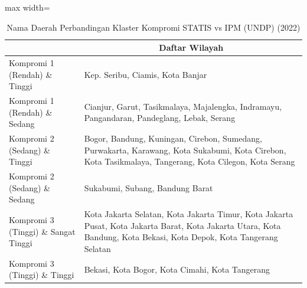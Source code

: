 \begin{table}[H]
\centering
\caption{Nama Daerah Perbandingan Klaster Kompromi STATIS vs IPM (UNDP) (2022)} \label{tab:app1comp_ipm_name_2022}
\begin{adjustbox}{max width=\textwidth}
\begin{tabular}{|>{\centering\arraybackslash}p{4cm}|p{10cm}|}
\hline
\multicolumn{1}{|c|}{\textbf{Kategori}} & \multicolumn{1}{c|}{\textbf{Daftar Wilayah}} \\
\hline
Kompromi 1 (Rendah) \& Tinggi & Kep. Seribu, Ciamis, Kota Banjar \\
\hline
Kompromi 1 (Rendah) \& Sedang & Cianjur, Garut, Tasikmalaya, Majalengka, Indramayu, Pangandaran, Pandeglang, Lebak, Serang \\
\hline
Kompromi 2 (Sedang) \& Tinggi & Bogor, Bandung, Kuningan, Cirebon, Sumedang, Purwakarta, Karawang, Kota Sukabumi, Kota Cirebon, Kota Tasikmalaya, Tangerang, Kota Cilegon, Kota Serang \\
\hline
Kompromi 2 (Sedang) \& Sedang & Sukabumi, Subang, Bandung Barat \\
\hline
Kompromi 3 (Tinggi) \& Sangat Tinggi & Kota Jakarta Selatan, Kota Jakarta Timur, Kota Jakarta Pusat, Kota Jakarta Barat, Kota Jakarta Utara, Kota Bandung, Kota Bekasi, Kota Depok, Kota Tangerang Selatan \\
\hline
Kompromi 3 (Tinggi) \& Tinggi & Bekasi, Kota Bogor, Kota Cimahi, Kota Tangerang \\
\hline
\end{tabular}
\end{adjustbox}
\end{table}